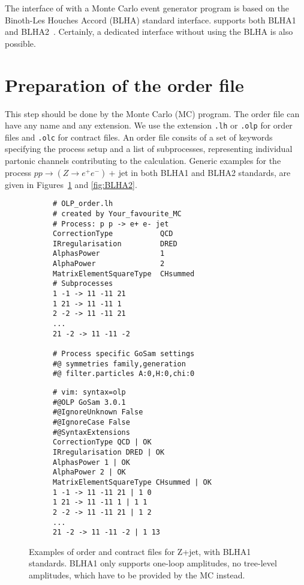 The interface of \gosam with a Monte Carlo event generator program is based on the Binoth-Les Houches Accord (BLHA) standard interface. \gosamv  supports both BLHA1~\cite{Binoth:2010xt} and BLHA2~\cite{Alioli:2013nda}. Certainly, a dedicated interface without using the BLHA is also possible.

%
%
%
%

\section{Preparation of the order file}
This step should be done by the Monte Carlo (MC) program. The order file can have any name and any extension. We use  the extension \texttt{.lh} or \texttt{.olp} for order files and \texttt{.olc} for contract files. An order file consits of a set of keywords specifying the process setup and a list of subprocesses, representing individual partonic channels contributing to the calculation. Generic examples for the process $pp\to (Z\to e^+e^-)+$\,jet in both BLHA1 and BLHA2 standards, are given in Figures~\ref{fig:BLHA1} and \ref{fig:BLHA2}.

\begin{figure}
\centering
\begin{subfigure}[]{0.49\textwidth}
\centering
\begin{lstlisting}[title={BLHA1 order file},gobble=0,style=insmall,keepspaces=true,frame=single]
# OLP_order.lh
# created by Your_favourite_MC
# Process: p p -> e+ e- jet
CorrectionType           QCD
IRregularisation         DRED
AlphasPower              1
AlphaPower               2
MatrixElementSquareType  CHsummed
# Subprocesses
1 -1 -> 11 -11 21
1 21 -> 11 -11 1
2 -2 -> 11 -11 21
...
21 -2 -> 11 -11 -2

# Process specific GoSam settings
#@ symmetries family,generation
#@ filter.particles A:0,H:0,chi:0
\end{lstlisting}
\end{subfigure}
\hspace*{5pt}
\begin{subfigure}[]{0.46\textwidth}
\centering
\begin{lstlisting}[title={BLHA1 contract file},gobble=0,style=insmall,keepspaces=true,frame=single]
# vim: syntax=olp
#@OLP GoSam 3.0.1
#@IgnoreUnknown False
#@IgnoreCase False
#@SyntaxExtensions
CorrectionType QCD | OK
IRregularisation DRED | OK
AlphasPower 1 | OK
AlphaPower 2 | OK
MatrixElementSquareType CHsummed | OK
1 -1 -> 11 -11 21 | 1 0
1 21 -> 11 -11 1 | 1 1
2 -2 -> 11 -11 21 | 1 2
...
21 -2 -> 11 -11 -2 | 1 13
\end{lstlisting}
\end{subfigure}
\caption{Examples of order and contract files for Z+jet, with BLHA1 standards. BLHA1 only supports one-loop amplitudes, no tree-level amplitudes, which have to be provided by the MC instead.}
\label{fig:BLHA1}
\end{figure}  

